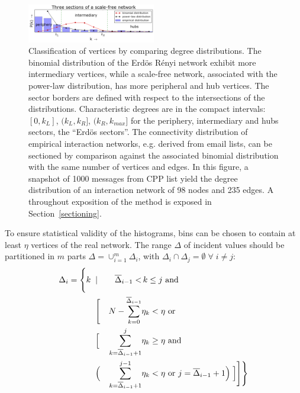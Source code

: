 \documentclass[%
	aip,
	jmp,%
	amsmath,amssymb,
	reprint,%
]{revtex4-1}
\begin{document}
\begin{figure}[!h]
	\centering
	\includegraphics[width=0.5\textwidth]{figs/fser__}
	\caption{Classification of vertices by comparing degree
		distributions.
		The binomial distribution of the Erd\"os R\'enyi network exhibit more intermediary vertices, while a scale-free network, associated with the power-law distribution,
		has more peripheral and hub vertices.
		The sector borders are defined with respect to the intersections of the distributions.
Characteristic degrees are in the compact intervals: $[0,k_L]$, $(k_L,k_R]$, $(k_R,k_{max}]$ for the periphery,
intermediary and hubs sectors, the ``Erd\"os sectors''.
		The connectivity distribution of empirical interaction networks, e.g. derived from email lists,
		can be sectioned by comparison against the associated binomial distribution with the same number of vertices and edges.
		In this figure, a snapshot of 1000 messages from CPP list yield the degree distribution
		of an interaction network of 98 nodes and 235 edges.
		A throughout exposition of the method is exposed in Section~\ref{sectioning}.}
		\label{fig:setores}
\end{figure}
To ensure statistical validity of the histograms, bins can be chosen to contain at least $\eta$ vertices of the real network.
The range $\Delta$ of incident values should be partitioned in $m$ parts $\Delta=\cup_{i=1}^m \Delta_i$,
with $\Delta_i\cap \Delta_j=\emptyset \; \forall\; i \neq j$:
\begin{align}
\Delta_i =\Biggl\{ k\;\; & | & \overline{\Delta}_{i-1}< &\, k\leq j \text{ and }\;\;\;\;\;\;\;\;\;\;\;\;\nonumber\\
		      & \Biggl[ & N - \sum_{k=0}^{\overline{\Delta}_{i-1}} & \eta_k< \eta \text{ or }\\
&	\Bigl[ & \sum_{k=\overline{\Delta}_{i-1}+1}^j &  \eta_k \geq \eta \text{ and }\;\;\;\;\;\;\nonumber\\
& \Bigl( &\sum_{k=\overline{\Delta}_{i-1}+1}^{j-1} &  \eta_k < \eta \text{ or }   j=\overline{\Delta}_{i-1}+1 \Bigr) \;\Bigr] \Biggr] \Biggr\}\nonumber
\end{align}
	
\end{document}
